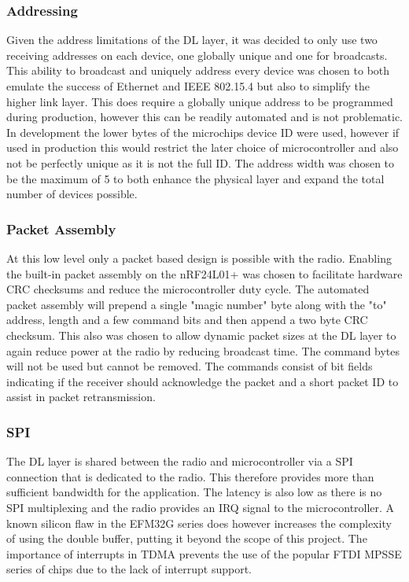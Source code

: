 \subsubsection{Addressing}
Given the address limitations of the DL layer, it was decided to only use two receiving addresses on
each device, one globally unique and one for broadcasts. This ability to broadcast and uniquely
address every device was chosen to both emulate the success of Ethernet and IEEE 802.15.4 but also
to simplify the higher link layer. This does require a globally unique address to be programmed
during production, however this can be readily automated and is not problematic. In development
the lower bytes of the microchips device ID were used, however if used in production this would
restrict the later choice of microcontroller and also not be perfectly unique as it is not the full ID. The
address width was chosen to be the maximum of 5 to both enhance the physical layer and expand
the total number of devices possible.

\subsubsection{Packet Assembly}
At this low level only a packet based design is possible with the radio. Enabling the built-in packet
assembly on the nRF24L01+ was chosen to facilitate hardware CRC checksums and reduce the
microcontroller duty cycle. The automated packet assembly will prepend a single "magic number"
byte along with the "to" address, length and a few command bits and then append a two byte CRC
checksum. This also was chosen to allow dynamic packet sizes at the DL layer to again reduce power
at the radio by reducing broadcast time. The command bytes will not be used but cannot be
removed. The commands consist of bit fields indicating if the receiver should acknowledge the
packet and a short packet ID to assist in packet retransmission.

\subsubsection{SPI}
The DL layer is shared between the radio and microcontroller via a SPI connection that is dedicated
to the radio. This therefore provides more than sufficient bandwidth for the application. The latency
is also low as there is no SPI multiplexing and the radio provides an IRQ signal to the microcontroller.
A known silicon flaw in the EFM32G series does however increases the complexity of using the
double buffer, putting it beyond the scope of this project\cite{EnergyMicroErata2012}. The importance
of interrupts in TDMA prevents the use of the popular FTDI MPSSE series of chips due to the lack of
interrupt support.

